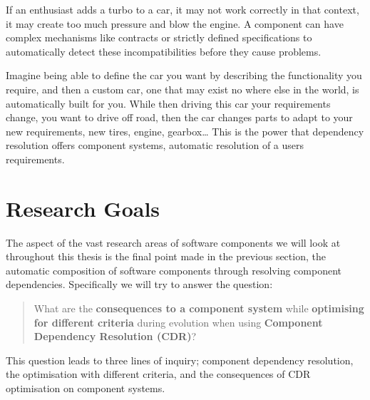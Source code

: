 \documentclass[a4paper]{report}
\begin{document}
If an enthusiast adds a turbo to a car, it may not work correctly in that context, it may create too much pressure and blow the engine.
A component can have complex mechanisms like contracts or strictly defined specifications to automatically detect these incompatibilities before they cause problems.

Imagine being able to define the car you want by describing the functionality you require, and then a custom car, one that may exist no where else in the world,
is automatically built for you. 
While then driving this car your requirements change, you want to drive off road, then the car changes parts to adapt to your new requirements, new tires, engine, gearbox\ldots
This is the power that dependency resolution offers component systems, automatic resolution of a users requirements.

\section{Research Goals}
{}The aspect of the vast research areas of software components we will look at throughout this thesis is the final point made in the previous section, 
{}the automatic composition of software components through resolving component dependencies.
{}Specifically we will try to answer the question:\\
{}\begin{quote}
{}What are the \textbf{consequences to a component system} while \textbf{optimising for different criteria} during evolution when using \textbf{Component Dependency Resolution (CDR)}?
{}\end{quote}

{}This question leads to three lines of inquiry; component dependency resolution, the optimisation with different criteria, and the consequences of CDR optimisation on component systems.

\end{document}
